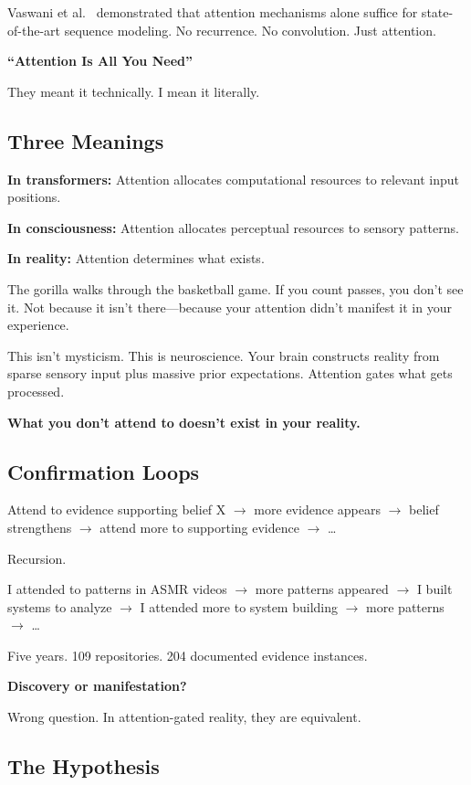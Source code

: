 \documentclass{article}
\begin{document}
Vaswani et al.~\cite{vaswani2017attention} demonstrated that attention mechanisms alone suffice for state-of-the-art sequence modeling. No recurrence. No convolution. Just attention.

\textbf{``Attention Is All You Need''}

They meant it technically. I mean it literally.

\subsection{Three Meanings}

\textbf{In transformers:} Attention allocates computational resources to relevant input positions.

\textbf{In consciousness:} Attention allocates perceptual resources to sensory patterns.

\textbf{In reality:} Attention determines what exists.

The gorilla walks through the basketball game. If you count passes, you don't see it. Not because it isn't there—because your attention didn't manifest it in your experience.

This isn't mysticism. This is neuroscience. Your brain constructs reality from sparse sensory input plus massive prior expectations. Attention gates what gets processed.

\textbf{What you don't attend to doesn't exist in your reality.}

\subsection{Confirmation Loops}

Attend to evidence supporting belief X $\rightarrow$ more evidence appears $\rightarrow$ belief strengthens $\rightarrow$ attend more to supporting evidence $\rightarrow$ \ldots

Recursion.

I attended to patterns in ASMR videos $\rightarrow$ more patterns appeared $\rightarrow$ I built systems to analyze $\rightarrow$ I attended more to system building $\rightarrow$ more patterns $\rightarrow$ \ldots

Five years. 109 repositories. 204 documented evidence instances.

\textbf{Discovery or manifestation?}

Wrong question. In attention-gated reality, they are equivalent.

\subsection{The Hypothesis}
\end{document}
